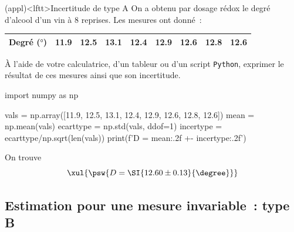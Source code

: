 \documentclass[../../main/main.tex]{subfiles}
\begin{document}
\begin{tcb*}(appl)<lftt>{Incertitude de type A}
	On a obtenu par dosage rédox le degré d'alcool d'un vin à 8 reprises. Les
	mesures ont donné~:
	\begin{center}
		\begin{tabular}{lcccccccc}
			\toprule
			Degré ($\si{\degree}$) &
			\num{11.9}             &
			\num{12.5}             &
			\num{13.1}             &
			\num{12.4}             &
			\num{12.9}             &
			\num{12.6}             &
			\num{12.8}             &
			\num{12.6}
			\\
			\bottomrule
		\end{tabular}
	\end{center}
	À l'aide de votre calculatrice, d'un tableur ou d'un script \texttt{Python},
	exprimer le résultat de ces mesures ainsi que son incertitude.
	\tcblower
	\begin{python}
import numpy as np

vals = np.array([11.9, 12.5, 13.1, 12.4, 12.9, 12.6, 12.8, 12.6])
mean = np.mean(vals)
ecarttype = np.std(vals, ddof=1)
incertype = ecarttype/np.sqrt(len(vals))
print(f'D = {mean:.2f} +- {incertype:.2f}')
	\end{python}
	On trouve
	\[
		\xul{
			\psw{
				D = \SI{12.60 \pm  0.13}{\degree}
			}
		}
	\]
\end{tcb*}

\subsection{Estimation pour une mesure invariable~: type B}
\end{document}
